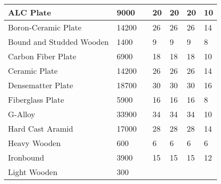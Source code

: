 \documentclass[twoside]{book}
\begin{document}
\begin{longtable}{p{1.25in}llp{3em}p{3em}p{3em}p{3em}}
  \\
  \endhead
      
  \raggedright
           ALC Plate 
  &
   9000 
  &
  
  &
   20 
  &
   20 
  &
   20 
  &
   10 
  \tabularnewline
  \hline
      
  \raggedright
           Boron-Ceramic Plate 
  &
   14200 
  &
  
  &
   26 
  &
   26 
  &
   26 
  &
   14 
  \tabularnewline
  \hline
      
  \raggedright
           Bound and Studded Wooden
           
  &
   1400 
  &
  
  &
   9 
  &
   9 
  &
   9 
  &
   8 
  \tabularnewline
  \hline
      
  \raggedright
           Carbon Fiber Plate 
  &
   6900 
  &
  
  &
   18 
  &
   18 
  &
   18 
  &
   10 
  \tabularnewline
  \hline
      
  \raggedright
           Ceramic Plate 
  &
   14200 
  &
  
  &
   26 
  &
   26 
  &
   26 
  &
   14 
  \tabularnewline
  \hline
      
  \raggedright
           Densematter Plate 
  &
   18700 
  &
  
  &
   30 
  &
   30 
  &
   30 
  &
   16 
  \tabularnewline
  \hline
      
  \raggedright
           Fiberglass Plate 
  &
   5900 
  &
  
  &
   16 
  &
   16 
  &
   16 
  &
   8 
  \tabularnewline
  \hline
      
  \raggedright
           G-Alloy 
  &
   33900 
  &
  
  &
   34 
  &
   34 
  &
   34 
  &
   10 
  \tabularnewline
  \hline
      
  \raggedright
           Hard Cast Aramid 
  &
   17000 
  &
  
  &
   28 
  &
   28 
  &
   28 
  &
   14 
  \tabularnewline
  \hline
      
  \raggedright
           Heavy Wooden 
  &
   600 
  &
  
  &
   6 
  &
   6 
  &
   6 
  &
   6 
  \tabularnewline
  \hline
      
  \raggedright
           Ironbound 
  &
   3900 
  &
  
  &
   15 
  &
   15 
  &
   15 
  &
   12 
  \tabularnewline
  \hline
      
  \raggedright
           Light Wooden 
  &
   300 
  &
  

\end{longtable}
\end{document}
